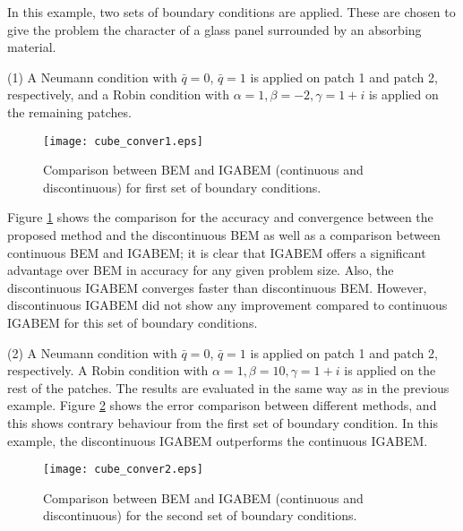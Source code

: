 \documentclass[review]{elsarticle}
\begin{document}
In this example, two sets of boundary conditions are applied. These are chosen to give the problem the character of a glass panel surrounded by an absorbing material.

(1) A Neumann condition with  $\bar q=0$, $\bar q=1$ is applied on patch 1 and patch 2, respectively, and a Robin condition with $\alpha=1,\beta=-2,\gamma =1+i$ is applied on the remaining patches. 
\begin{figure}[!htb]


	\centering
	\texttt{[image: cube\_conver1.eps]}
	\caption{Comparison between BEM and IGABEM (continuous and discontinuous) for first set of boundary conditions.}
	\label{cube_conver1}
\end{figure}


Figure \ref{cube_conver1} shows the comparison for the accuracy and convergence between the proposed method and the discontinuous BEM as well as a comparison between continuous BEM and IGABEM; it is clear that IGABEM offers a significant advantage over BEM in accuracy for any given problem size. Also, the discontinuous IGABEM converges faster than discontinuous BEM. However, discontinuous IGABEM did not show any improvement compared to continuous IGABEM for this set of boundary conditions.


(2) A Neumann condition with $\bar q=0$, $\bar q=1$ is applied on patch 1 and patch 2, respectively. A Robin condition with $\alpha=1,\beta=10,\gamma =1+i$ is applied on the rest of the patches. The results are evaluated in the same way as in the previous example. Figure \ref{cube_conver2} shows the error comparison between different methods, and this shows contrary behaviour from the first set of boundary condition. In this example, the discontinuous IGABEM outperforms the continuous IGABEM. 
\begin{figure}[!htb]
	\centering
	\texttt{[image: cube\_conver2.eps]}
	\caption{Comparison between BEM and IGABEM (continuous and discontinuous) for the second set of boundary conditions.}
	\label{cube_conver2}
\end{figure}
\end{document}
